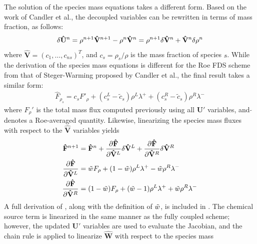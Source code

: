 The solution of the species mass equations takes a different form.  Based on the
work of Candler et al.\cite{candler}, the decoupled variables can be rewritten
in terms of mass fraction, as follows:
\begin{equation} 
  \delta \mathbf{\hat{U}}^n 
  = \rho^{n+1} \mathbf{\hat{V}}^{n+1} - \rho^n\mathbf{\hat{V}}^n 
  = \rho^{n+1} \delta \mathbf{\hat{V}}^n + \mathbf{\hat{V}}^n \delta \rho^n
  \label{du-to-dv-mass-frac}
\end{equation}
where $\mathbf{\hat{V}}=(c_1,\hdots,c_{ns})^T$, and $c_s=\rho_s/\rho$ is the
mass fraction of species $s$.  While the derivation of the species mass
equations is different for the Roe FDS scheme from that of Steger-Warming
proposed by Candler et al.\cite{candler}, the final result takes a similar form: 
\begin{gather} 
  \hat{F}_{\rho_s} 
  = c_s F'_\rho+(c_s^L-\tilde{c}_s)\rho^L\lambda^+
  + (c_s^R-\tilde{c}_s)\rho^R\lambda^-
  \label{dc-flux}
\end{gather}
where $F_\rho'$ is the total mass flux computed previously using all
$\mathbf{U}'$ variables, and $\tilde{}$ denotes a Roe-averaged quantity.
Likewise, linearizing the species mass fluxes with respect to the
$\mathbf{\hat{V}}$ variables yields
\begin{align} 
  \mathbf{\hat{F}}^{n+1} &=
  \mathbf{\hat{F}}^n 
  + \frac{\partial \mathbf{\hat{F}}}{\partial \mathbf{\hat{V}}^L} \delta \mathbf{\hat{V}}^L 
  + \frac{\partial \mathbf{\hat{F}}}{\partial \mathbf{\hat{V}}^R} \delta \mathbf{\hat{V}}^R
  \label{flux-dc-taylor} \\
  \frac{\partial \mathbf{\hat{F}}}{\partial \mathbf{\hat{V}}^L} &= 
  \tilde{w} F_\rho+(1-\tilde{w})\rho^L\lambda^+ - \tilde{w} \rho^R\lambda^- 
  \label{dfdvl} \\
  \frac{\partial \mathbf{\hat{F}}}{\partial \mathbf{\hat{V}}^R} &= 
  ( 1-\tilde{w} )F_\rho+(\tilde{w} -1)\rho^L\lambda^+ + \tilde{w} \rho^R\lambda^- 
  \label{dfdvr}
\end{align}
A full derivation of , along with the definition of
$\tilde{w}$, is included in . The chemical source
term is linearized in the same manner as the fully coupled scheme; however, the
updated $\mathbf{U}'$ variables are used to evaluate the Jacobian, and the chain
rule is applied to linearize $\mathbf{\hat{W}}$ with respect to the species mass
